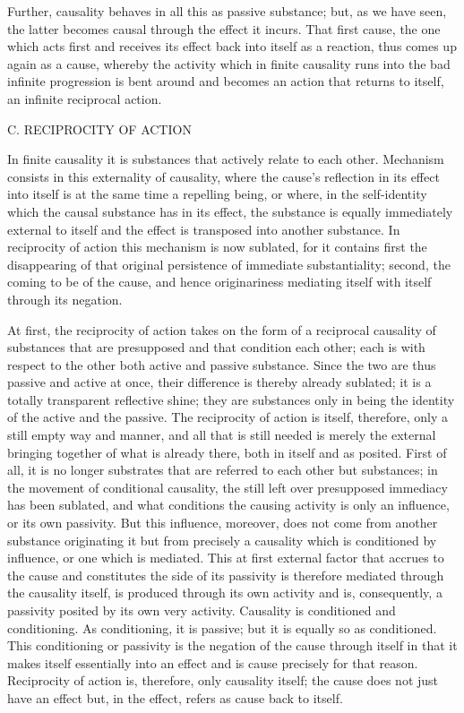 Further, causality behaves in all this as passive substance;
but, as we have seen, the latter becomes causal
through the effect it incurs.
That first cause, the one which acts first
and receives its effect back into itself as a reaction,
thus comes up again as a cause,
whereby the activity which in finite causality
runs into the bad infinite progression
is bent around and becomes an action
that returns to itself,
an infinite reciprocal action.

C. RECIPROCITY OF ACTION

In finite causality it is substances
that actively relate to each other.
Mechanism consists in this externality of causality,
where the cause's reflection in its effect into itself
is at the same time a repelling being,
or where, in the self-identity which
the causal substance has in its effect,
the substance is equally immediately external to itself
and the effect is transposed into another substance.
In reciprocity of action this mechanism is now sublated,
for it contains first the disappearing of
that original persistence of immediate substantiality;
second, the coming to be of the cause,
and hence originariness mediating
itself with itself through its negation.

At first, the reciprocity of action takes on
the form of a reciprocal causality of substances
that are presupposed and that condition each other;
each is with respect to the other
both active and passive substance.
Since the two are thus passive and active at once,
their difference is thereby already sublated;
it is a totally transparent reflective shine;
they are substances only in being
the identity of the active and the passive.
The reciprocity of action is itself,
therefore, only a still empty way and manner,
and all that is still needed is merely
the external bringing together of what is already there,
both in itself and as posited.
First of all, it is no longer substrates
that are referred to each other but substances;
in the movement of conditional causality,
the still left over presupposed immediacy has been sublated,
and what conditions the causing activity is only an influence,
or its own passivity.
But this influence, moreover, does not come from
another substance originating it
but from precisely a causality
which is conditioned by influence,
or one which is mediated.
This at first external factor that accrues to the cause
and constitutes the side of its passivity is
therefore mediated through the causality itself,
is produced through its own activity
and is, consequently, a passivity
posited by its own very activity.
Causality is conditioned and conditioning.
As conditioning, it is passive;
but it is equally so as conditioned.
This conditioning or passivity is
the negation of the cause through itself
in that it makes itself essentially into an effect
and is cause precisely for that reason.
Reciprocity of action is, therefore, only causality itself;
the cause does not just have an effect
but, in the effect, refers as cause back to itself.

